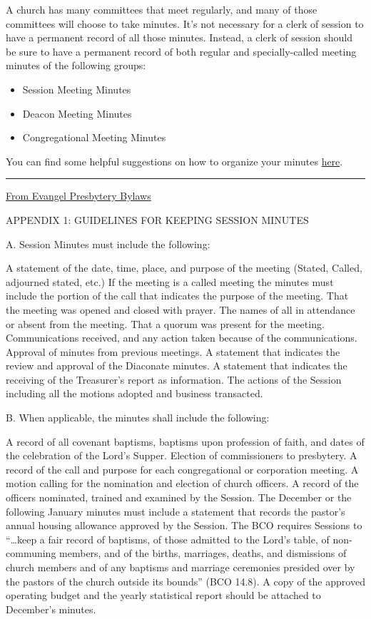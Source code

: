 \documentclass[
]{book}
\providecommand{\tightlist}{%
  \setlength{\itemsep}{0pt}\setlength{\parskip}{0pt}}
\begin{document}
A church has many committees that meet regularly, and many of those committees will choose to take minutes. It's not necessary for a clerk of session to have a permanent record of all those minutes. Instead, a clerk of session should be sure to have a permanent record of both regular and specially-called meeting minutes of the following groups:

\begin{itemize}
\tightlist
\item
  Session Meeting Minutes
\item
  Deacon Meeting Minutes
\item
  Congregational Meeting Minutes
\end{itemize}

You can find some helpful suggestions on how to organize your minutes \href{organization-of-files.html}{here}.

\begin{center}\rule{0.5\linewidth}{0.5pt}\end{center}

\href{https://docs.google.com/document/d/1WZ4PrWPCNPNsUEmfXLPNXCNJz5qaB09T3HXnCkPh2ak/edit?usp=sharing}{From Evangel Presbytery Bylaws}

APPENDIX 1: GUIDELINES FOR KEEPING SESSION MINUTES

A. Session Minutes must include the following:

A statement of the date, time, place, and purpose of the meeting (Stated, Called, adjourned stated, etc.)
If the meeting is a called meeting the minutes must include the portion of the call that indicates the purpose of the meeting.
That the meeting was opened and closed with prayer.
The names of all in attendance or absent from the meeting.
That a quorum was present for the meeting.
Communications received, and any action taken because of the communications.
Approval of minutes from previous meetings.
A statement that indicates the review and approval of the Diaconate minutes.
A statement that indicates the receiving of the Treasurer's report as information.
The actions of the Session including all the motions adopted and business transacted.

B. When applicable, the minutes shall include the following:

A record of all covenant baptisms, baptisms upon profession of faith, and dates of the celebration of the Lord's Supper.
Election of commissioners to presbytery.
A record of the call and purpose for each congregational or corporation meeting.
A motion calling for the nomination and election of church officers.
A record of the officers nominated, trained and examined by the Session.
The December or the following January minutes must include a statement that records the pastor's annual housing allowance approved by the Session.
The BCO requires Sessions to ``\ldots keep a fair record of baptisms, of those admitted to the Lord's table, of non-communing members, and of the births, marriages, deaths, and dismissions of church members and of any baptisms and marriage ceremonies presided over by the pastors of the church outside its bounds'' (BCO 14.8).
A copy of the approved operating budget and the yearly statistical report should be attached to December's minutes.
\end{document}
